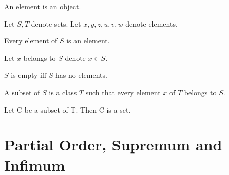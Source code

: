\documentclass{article}
\begin{document}
  \begin{forthel}

    \begin{signature}
      An element is an object.
    \end{signature}

    Let $S,T$ denote sets.
    Let $x,y,z,u,v,w$ denote elements.

    \begin{axiom}
      Every element of $S$ is an element.
    \end{axiom}

    Let $x$ belongs to $S$ denote $x \in S$.

    \begin{definition}[DefEmpty]
      $S$ is empty iff $S$ has no elements.
    \end{definition}

    \begin{definition}[DefSub]
      A subset of $S$ is a class $T$ such that every element $x$ of $T$ belongs to $S$.
    \end{definition}

    \begin{axiom}
      Let C be a subset of T. Then C is a set.
    \end{axiom}
  \end{forthel}

  \section{Partial Order, Supremum and Infimum}
\end{document}
